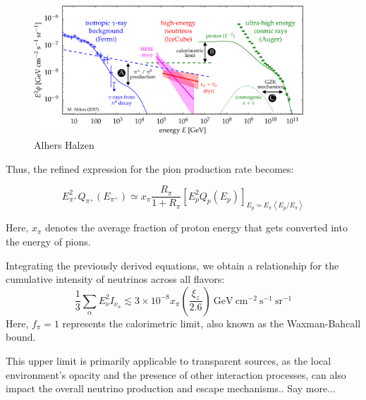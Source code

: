 \begin{figure}[!t]
\centering
\includegraphics[width=0.90\textwidth]{figures/panorama.pdf}
\caption{Alhers Halzen~\cite{Ahlers2018ppnp}}
\end{figure}

Thus, the refined expression for the pion production rate becomes:
%
\begin{remark}
\[
E^2_{\pi^+} Q_{\pi^+} (E_{\pi^+}) \simeq x_{\pi} \frac{R_{\pi}}{1 + R_{\pi}}  \left[E^2_p Q_p(E_p) \right]_{E_p \simeq E_{\pi} \left\langle {E_p}/{E_{\pi}} \right\rangle}
\]
\end{remark}

Here, \(x_{\pi}\) denotes the average fraction of proton energy that gets converted into the energy of pions.

Integrating the previously derived equations, we obtain a relationship for the cumulative intensity of neutrinos across all flavors:
\[
\frac{1}{3} \sum_\alpha E_\nu^2 I_{\nu_\alpha} \lesssim 3 \times 10^{-8} x_\pi \left( \frac{\xi_z}{2.6} \right)~\text{GeV}~\text{cm}^{-2}~\text{s}^{-1}~\text{sr}^{-1}
\]
Here, \( f_\pi = 1 \) represents the calorimetric limit, also known as the Waxman-Bahcall bound. 

This upper limit is primarily applicable to transparent sources, as the local environment's opacity and the presence of other interaction processes, can also impact the overall neutrino production and escape mechanisms.. {\color{red}Say more...}

%

